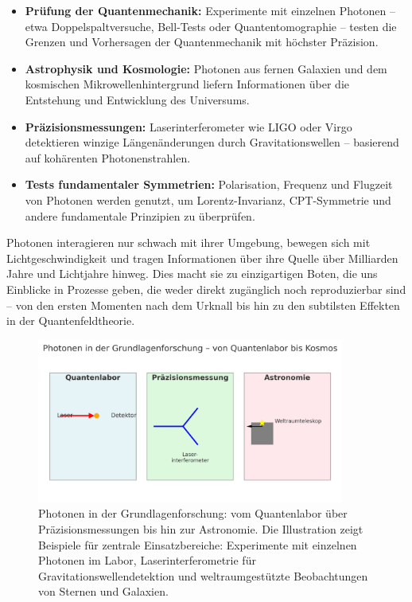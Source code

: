 \begin{itemize}
	\item \textbf{Prüfung der Quantenmechanik:} Experimente mit einzelnen Photonen – etwa Doppelspaltversuche, Bell-Tests oder Quantentomographie – testen die Grenzen und Vorhersagen der Quantenmechanik mit höchster Präzision.
	\item \textbf{Astrophysik und Kosmologie:} Photonen aus fernen Galaxien und dem kosmischen Mikrowellenhintergrund liefern Informationen über die Entstehung und Entwicklung des Universums.
	\item \textbf{Präzisionsmessungen:} Laserinterferometer wie LIGO oder Virgo detektieren winzige Längenänderungen durch Gravitationswellen – basierend auf kohärenten Photonenstrahlen.
	\item \textbf{Tests fundamentaler Symmetrien:} Polarisation, Frequenz und Flugzeit von Photonen werden genutzt, um Lorentz-Invarianz, CPT-Symmetrie und andere fundamentale Prinzipien zu überprüfen.
	
\end{itemize}
\vspace{1em}
\begin{tcolorbox}[physikbox, title={Photonen als Boten der Naturgesetze}, label={box:photonen_grundlagen}]
	\small
	Photonen interagieren nur schwach mit ihrer Umgebung, bewegen sich mit Lichtgeschwindigkeit und tragen Informationen über ihre Quelle über Milliarden Jahre und Lichtjahre hinweg. 
	Dies macht sie zu einzigartigen Boten, die uns Einblicke in Prozesse geben, die weder direkt zugänglich noch reproduzierbar sind – von den ersten Momenten nach dem Urknall bis hin zu den subtilsten Effekten in der Quantenfeldtheorie.
\end{tcolorbox}
\begin{figure}[H]
	\centering
	\includegraphics[width=0.9\textwidth]{bilder/photonen_grundlagenforschung.png} %
	\caption{Photonen in der Grundlagenforschung: 
		vom Quantenlabor über Präzisionsmessungen bis hin zur Astronomie. 
		Die Illustration zeigt Beispiele für zentrale Einsatzbereiche: 
		Experimente mit einzelnen Photonen im Labor, Laserinterferometrie für Gravitationswellendetektion und weltraumgestützte Beobachtungen von Sternen und Galaxien.}
	\label{fig:photonen_grundlagen}
\end{figure}

